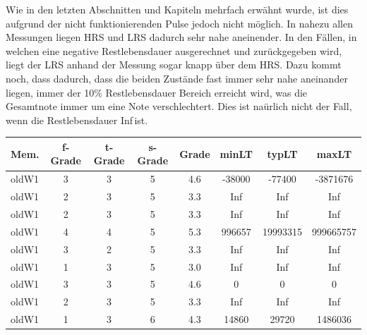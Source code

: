 Wie in den letzten Abschnitten und Kapiteln mehrfach erwähnt wurde, ist dies aufgrund der nicht funktionierenden Pulse jedoch nicht möglich. In nahezu allen Messungen liegen HRS und LRS dadurch sehr nahe aneinender. In den Fällen, in welchen eine negative Restlebensdauer ausgerechnet und zurückgegeben wird, liegt der LRS anhand der Messung sogar knapp über dem HRS. Dazu kommt noch, dass dadurch, dass die beiden Zustände fast immer sehr nahe aneinander liegen, immer der 10\% Restlebensdauer Bereich erreicht wird, was die Gesamtnote immer um eine Note verschlechtert. Dies ist naürlich nicht der Fall, wenn die Restlebensdauer \glqq Inf\grqq\,ist.


\begin{table}
  \centering
    \begin{tabular}{l|c|c|c|c|c|c|c}
      \textbf{Mem.} & \textbf{f-Grade} & \textbf{t-Grade} & \textbf{s-Grade} & \textbf{Grade} & \textbf{minLT} & \textbf{typLT} & \textbf{maxLT} \\\hline
      oldW1          &  3               & 3                &  5               &  4.6           & -38000         & -77400         & -3871676\\
      oldW1          &  2               & 3                &  5               &  3.3           & Inf            & Inf            & Inf     \\
      oldW1          &  2               & 3                &  5               &  3.3           & Inf            & Inf            & Inf     \\
      oldW1          &  4               & 4                &  5               &  5.3           & 996657         & 19993315       & 999665757\\
      oldW1          &  3               & 2                &  5               &  3.3           & Inf            & Inf            & Inf     \\
      oldW1          &  1               & 3                &  5               &  3.0           & Inf            & Inf            & Inf     \\
      oldW1          &  3               & 3                &  5               &  4.6           & 0              & 0              & 0    \\
      oldW1          &  2               & 3                &  5               &  3.3           & Inf            & Inf            & Inf     \\
      oldW1          &  1               & 3                &  6               &  4.3           & 14860          & 29720          & 1486036 \\

\end{tabular}
\end{table}
